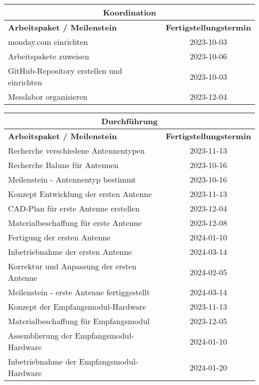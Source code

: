 \begin{table}[!ht]
	\begin{tabular}{|l|c|}
		\multicolumn{2}{c}{\textbf{Koordination}} \\ \hline
		\textbf{Arbeitspaket / Meilenstein} & \textbf{Fertigstellungstermin} \\ \hline
		monday.com einrichten & 2023-10-03 \\ \hline
		Arbeitspakete zuweisen & 2023-10-06 \\ \hline
		GitHub-Repository erstellen und einrichten & 2023-10-03 \\ \hline
		Messlabor organisieren & 2023-12-04 \\ \hline
	\end{tabular}
\end{table}

\begin{table}[!ht]
	\begin{tabular}{|l|c|}
		\multicolumn{2}{c}{\textbf{Durchführung}} \\ \hline
		\textbf{Arbeitspaket / Meilenstein} & \textbf{Fertigstellungstermin} \\ \hline
		Recherche verschiedene Antennentypen & 2023-11-13 \\ \hline
		Recherche Baluns für Antennen & 2023-10-16 \\ \hline
		Meilenstein - Antennentyp bestimmt & 2023-10-16 \\ \hline
		Konzept Entwicklung der ersten Antenne & 2023-11-13 \\ \hline
		CAD-Plan für erste Antenne erstellen & 2023-12-04 \\ \hline
		Materialbeschaffung für erste Antenne & 2023-12-08 \\ \hline
		Fertigung der ersten Antenne & 2024-01-10 \\ \hline
		Inbetriebnahme der ersten Antenne & 2024-03-14 \\ \hline
		Korrektur und Anpassung der ersten Antenne & 2024-02-05 \\ \hline
		Meilenstein - erste Antenne fertiggestellt & 2024-03-14 \\ \hline
		Konzept der Empfangsmodul-Hardware & 2023-11-13 \\ \hline
		Materialbeschaffung für Empfangsmodul & 2023-12-05 \\ \hline
		Assemblierung der Empfangsmodul-Hardware & 2024-01-10 \\ \hline
		Inbetriebnahme der Empfangsmodul-Hardware & 2024-01-20 \\ \hline

\end{tabular}
\end{table}
